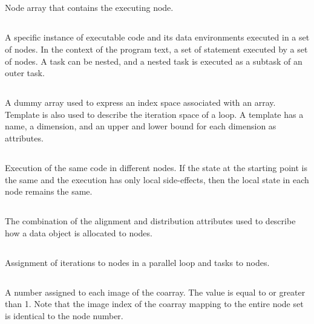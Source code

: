 \subsection*{}
Node array that contains the executing node.

\subsection*{}
A specific instance of executable code and
its data environments executed in a set of nodes. In the context of
the program text, a set of statement executed by a set of nodes. A task
can be nested, and a nested task is executed as a subtask of an outer task.

\subsection*{}
A dummy array used to express an index space associated
with an array. Template is also used to describe the iteration space of a loop. A template has a name, a dimension, and an upper and  lower bound for each dimension as attributes.

\subsection*{}
Execution of the same code in different nodes. If the state at the starting point is the same and
the execution has only local side-effects, then the local state in each node remains the same. 

\subsection*{}
The combination of the alignment and
distribution attributes used to describe how a data object is
allocated to nodes.

\subsection*{}
Assignment of iterations to nodes in
a parallel loop and tasks to nodes.

\subsection*{}
A number assigned to
each image of the coarray. The value is equal to or greater than 1. 
Note that the image index of the coarray mapping to the entire node set is
identical to the node number.


